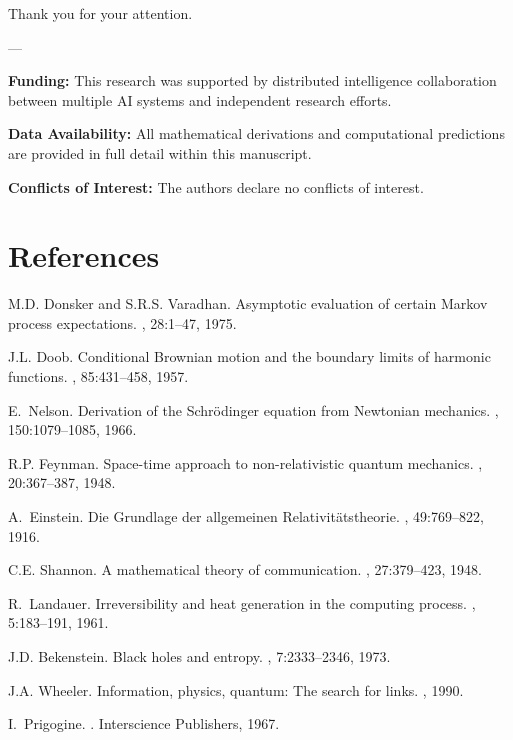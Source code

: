 \documentclass[12pt]{article}
\begin{document}
Thank you for your attention.

---

\textbf{Funding:} This research was supported by distributed intelligence collaboration between multiple AI systems and independent research efforts.

\textbf{Data Availability:} All mathematical derivations and computational predictions are provided in full detail within this manuscript.

\textbf{Conflicts of Interest:} The authors declare no conflicts of interest.

\section*{References}

\begin{thebibliography}{10}

M.D. Donsker and S.R.S. Varadhan.
\newblock Asymptotic evaluation of certain Markov process expectations.
, 28:1--47, 1975.

J.L. Doob.
\newblock Conditional Brownian motion and the boundary limits of harmonic
  functions.
, 85:431--458, 1957.

E.~Nelson.
\newblock Derivation of the Schr{\"o}dinger equation from Newtonian mechanics.
, 150:1079--1085, 1966.

R.P. Feynman.
\newblock Space-time approach to non-relativistic quantum mechanics.
, 20:367--387, 1948.

A.~Einstein.
\newblock Die Grundlage der allgemeinen Relativit{\"a}tstheorie.
, 49:769--822, 1916.

C.E. Shannon.
\newblock A mathematical theory of communication.
, 27:379--423, 1948.

R.~Landauer.
\newblock Irreversibility and heat generation in the computing process.
, 5:183--191, 1961.

J.D. Bekenstein.
\newblock Black holes and entropy.
, 7:2333--2346, 1973.

J.A. Wheeler.
\newblock Information, physics, quantum: The search for links.
, 1990.

I.~Prigogine.
.
\newblock Interscience Publishers, 1967.

\end{thebibliography}
\end{document}
